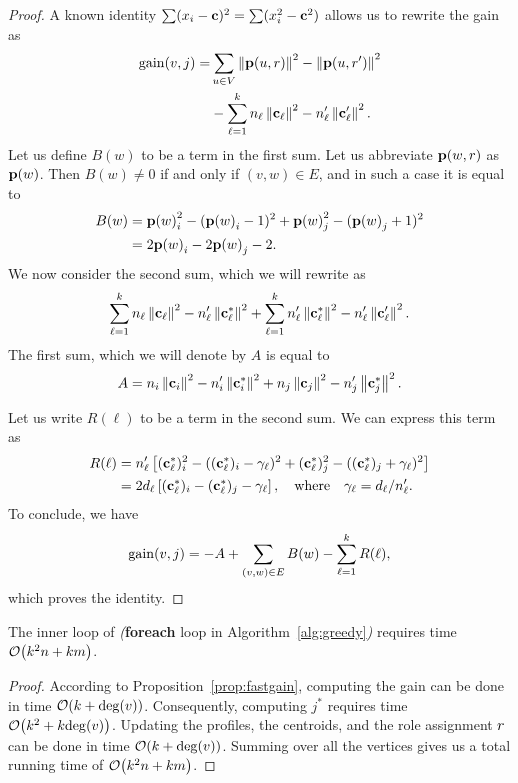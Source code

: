 \begin{proof}
A known identity $\sum (x_i - \mathbf{c})^2 = \sum (x_i^2 - \mathbf{c}^2)$ allows us to 
rewrite the gain as
\[
\begin{split}
	\gain{v, j} = & \sum_{u \in V} \norm{\prof{u, \role}}^2 -  \norm{\prof{u, \role'}}^2 \\
	& - \sum_{\ell = 1}^k n_\ell \norm{\centroid_\ell}^2 -  n_\ell' \norm{\centroid_\ell'}^2.
\end{split}
\]
Let us define $B(w)$ to be a term in the first sum.
Let us abbreviate $\prof{w, \role}$ as $\prof{w}$.
Then $B(w) \neq 0$ if and only if $(v, w) \in E$,
and in such a case it is equal to
\[
\begin{split}
	B(w) & = \prof{w}_i^2 - (\prof{w}_i - 1)^2 + \prof{w}_j^2 - (\prof{w}_j + 1)^2 \\
	& = 2\prof{w}_i - 2\prof{w}_j  - 2.
\end{split}
\]
We now consider the second sum, which we will rewrite as
\[
	\sum_{\ell = 1}^k n_\ell \left\|\mathbf{c}_\ell\right\|^2 -  n_\ell' \left\|\mathbf{c}_\ell^*\right\|^2 +
	\sum_{\ell = 1}^k n_\ell' \left\|\mathbf{c}_\ell^*\right\|^2 -  n_\ell' \left\|\mathbf{c}_\ell'\right\|^2.
\]
The first sum, which we will denote by $A$ is equal to
\[
	A = n_i\left\|\mathbf{c}_i\right\|^2 - n_i'\left\|\mathbf{c}_i^*\right\|^2 + n_j\left\|\mathbf{c}_j\right\|^2 - n_j'\left\|\mathbf{c}_j^*\right\|^2. 
\]

Let us write $R(\ell)$ to be a term in the second sum. We can express this term as
\[
\begin{split}
	R(\ell) & = n_\ell'\left[(\mathbf{c}_\ell^*)_i^2 - ((\mathbf{c}_\ell^*)_i - \gamma_\ell)^2 + (\mathbf{c}_\ell^*)_j^2 - ((\mathbf{c}_\ell^*)_j +  \gamma_\ell)^2\right] \\
	        & = 2d_\ell \left[(\mathbf{c}_\ell^*)_i - (\mathbf{c}_\ell^*)_j -  \gamma_\ell\right], \quad \text{where} \quad \gamma_\ell = d_\ell / n_\ell'.
\end{split}
\]
To conclude, we have
\[
	\gain{v, j} = - A + \sum_{(v, w) \in E} B(w) - \sum_{\ell = 1}^k R(\ell),
\]
which proves the identity.
\end{proof}



\begin{proposition}
The inner loop of \alggreedy
\emph{(}{\bf foreach} loop in Algorithm~\ref{alg:greedy}\emph{)} 
requires time $\bigO{k^2 n + km}$.
\end{proposition}

\begin{proof}
According to Proposition~\ref{prop:fastgain}, computing the gain can be done in time $\bigO{k + \dg{v}}$. 
Consequently, computing $j^*$ requires time $\bigO{k^2 + k\dg{v}}$. 
Updating the profiles, the centroids, and the role assignment $r$
can be done in time $\bigO{k + \dg{v}}$. 
Summing over all the vertices gives us a total running time of $\bigO{k^2 n + km}$.
\end{proof}
